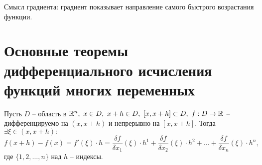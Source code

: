 Смысл градиента: градиент показывает направление самого быстрого возрастания функции.

\section{Основные теоремы дифференциального исчисления функций многих переменных}

\begin{theorem}[О среднем]
    Пусть $ D $ -- область в $ \R^n, \ x \in D, \ x + h \in D, \ [x, x+h]\subset D, \ f: D \rightarrow\R $ -- дифференцируемо на $ (x,x+h) $ и непрерывно на $ [x,x+h] $. Тогда $ \exists \xi \in (x,x+h): $
    \[
        f(x+h)-f(x) = f'(\xi)\cdot h = \frac{\delta f}{\delta x_1}(\xi)\cdot h^1 + \frac{\delta f}{\delta x_2}(\xi)\cdot h^2 + \ldots + \frac{\delta f}{\delta x_n}(\xi)\cdot h^n,
    \] где $ \{1,2,\ldots,n\} $ над $ h $ -- индексы.
\end{theorem}

